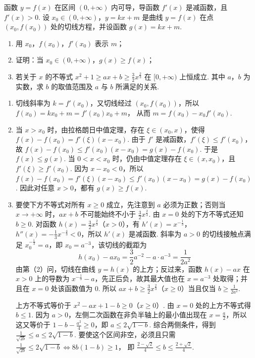 \begin{problem}
函数 \(y = f(x)\) 在区间 \((0, +\infty)\) 内可导，导函数 \(f'(x)\) 是减函数，且 \(f'(x) > 0\). 设 \(x_0 \in (0, +\infty)\)，\(y = kx + m\) 是曲线 \(y = f(x)\) 在点 \((x_0, f(x_0))\) 处的切线方程，并设函数 \(g(x) = kx + m\).

\begin{enumerate}
\item 用 \(x_0\)，\(f(x_0)\)，\(f'(x_0)\) 表示 \(m\)；
\item 证明：当 \(x_0 \in (0, +\infty)\)，\(g(x) \geqslant f(x)\)；
\item 若关于 \(x\) 的不等式 \(x^{2} + 1 \geqslant ax + b \geqslant \frac{3}{2}x^{\frac{2}{3}}\) 在 \([0, +\infty)\) 上恒成立. 其中 \(a\)，\(b\) 为实数，求 \(b\) 的取值范围及 \(a\) 与 \(b\) 所满足的关系.
\end{enumerate}

\begin{solution}
\begin{enumerate}
\item 切线斜率为 \(k=f'(x_0)\)，又切线经过 \((x_0,f(x_0))\)，所以
\(f(x_0)=kx_0+m=f'(x_0)x_0+m\)，
从而 \(m=f(x_0)-x_0f'(x_0)\).

\item 当 \(x>x_0\) 时，由拉格朗日中值定理，存在 \(\xi\in(x_0,x)\)，使得
\(f(x)-f(x_0)=f'(\xi)(x-x_0)\).
由于 \(f'\) 是减函数，\(f'(\xi)\leqslant f'(x_0)\)，故
\(f(x)-f(x_0)\leqslant f'(x_0)(x-x_0)=g(x)-f(x_0)\).
于是 \(f(x)\leqslant g(x)\). 当 \(0<x<x_0\) 时，仍由中值定理存在 \(\xi\in(x,x_0)\)，且 \(f'(\xi)\geqslant f'(x_0)\). 因为 \(x-x_0<0\)，所以
\(f(x)-f(x_0)=f'(\xi)(x-x_0)\leqslant f'(x_0)(x-x_0)=g(x)-f(x_0)\).
因此对任意 \(x>0\)，都有 \(g(x)\geqslant f(x)\).

\item 要使下方不等式对所有 \(x\geqslant0\) 成立，先注意到 \(a\) 必须为正数；否则当 \(x\to+\infty\) 时，\(ax+b\) 不可能始终不小于 \(\frac32x^{\frac{2}{3}}\). 由 \(x=0\) 处的下方不等式还知 \(b\geqslant0\). 对函数 \(h(x)=\frac32x^{\frac{2}{3}}\)（\(x>0\)），有
\(h'(x)=x^{-\frac{1}{3}}\)，\(h''(x)=-\frac13x^{-\frac{4}{3}}<0\)，所以 \(h'(x)\) 是减函数. 斜率为 \(a>0\) 的切线接触点满足 \(x_0^{-\frac{1}{3}}=a\)，即 \(x_0=a^{-3}\)，该切线的截距为
\[
h(x_0)-ax_0=\frac32a^{-2}-a\cdot a^{-3}=\frac1{2a^2}
\]
由第（2）问，切线在曲线 \(y=h(x)\) 的上方；反过来，函数 \(h(x)-ax\) 在 \(x>0\) 上的导数为 \(x^{-\frac{1}{3}}-a\)，先正后负，故其最大值也在 \(x=a^{-3}\) 处取得；并且在 \(x=0\) 处该函数值为 \(0\). 所以
\(ax+b\geqslant\frac32x^{\frac{2}{3}}\)（\(x\geqslant0\)）当且仅当 \(b\geqslant\frac1{2a^2}\).

上方不等式等价于
\(x^2-ax+1-b\geqslant0\)（\(x\geqslant0\)）.
由 \(x=0\) 处的上方不等式得 \(b\leqslant1\). 因为 \(a>0\)，左侧二次函数在非负半轴上的最小值出现在 \(x=\frac a2\)，所以这又等价于
\(1-b-\frac{a^2}{4}\geqslant0\)，即 \(a\leqslant2\sqrt{1-b}\).
综合两侧条件，得到
\(\frac1{\sqrt{2b}}\leqslant a\leqslant2\sqrt{1-b}\).
要使这个区间非空，必须且只需
\(\frac1{\sqrt{2b}}\leqslant2\sqrt{1-b}\Longleftrightarrow 8b(1-b)\geqslant1\)，
即
\(\frac{2-\sqrt2}{4}\leqslant b\leqslant\frac{2+\sqrt2}{4}\).
\end{enumerate}
\end{solution}
\end{problem}
